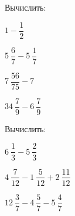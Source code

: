 \begin{listofex}
\begin{enumcols}[itemcolumns=2]
	\end{enumcols}
	\item Вычислить:
	\begin{enumcols}[itemcolumns=4]
		\item \( 1-\dfrac{1}{2} \)
		\item \( 5\:\dfrac{6}{7}-5\:\dfrac{1}{7} \)
		\item \( 7\:\dfrac{56}{75}-7 \)
		\item \( 34\:\dfrac{7}{9}-6\:\dfrac{7}{9} \)
	\end{enumcols}
	\item Вычислить:
	\begin{enumcols}[itemcolumns=3]
		\item \( 6\:\dfrac{1}{3}-5\:\dfrac{2}{3} \)
		\item \( 4\:\dfrac{7}{12}-1\:\dfrac{5}{12}+2\:\dfrac{11}{12} \)
		\item \( 12\:\dfrac{3}{7}-4\:\dfrac{5}{7}-5\:\dfrac{4}{7} \)
	\end{enumcols}
\end{listofex}
%	
%	
\newpage
{}
